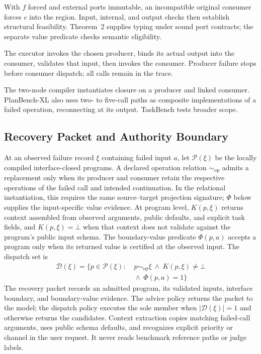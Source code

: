 With $f$ forced and external ports immutable, an incompatible original
consumer forces $c$ into the region. Input, internal, and output checks then
establish structural feasibility. Theorem~2 supplies typing under sound port
contracts; the separate value predicate checks semantic eligibility.

The executor invokes the chosen producer, binds its actual output into the
consumer, validates that input, then invokes the consumer. Producer failure
stops before consumer dispatch; all calls remain in the trace.

The two-node compiler instantiates closure on a producer and linked consumer.
PlanBench-XL also uses two- to five-call paths as composite implementations of
a failed operation, reconnecting at its output. TaskBench tests broader scope.

\subsection{Recovery Packet and Authority Boundary}
At an observed failure record $\xi$ containing failed input $a$, let
$\mathcal{P}(\xi)$ be the locally compiled interface-closed programs. A declared
operation relation $\sim_{\mathrm{op}}$ admits a
replacement only when its producer and consumer retain the respective
operations of the failed call and intended continuation. In the relational
instantiation, this requires the same source--target projection signature;
$\Phi$ below supplies the input-specific value evidence. At program level,
$K(p,\xi)$ returns context assembled from
observed arguments, public defaults, and explicit task fields, and
$K(p,\xi)=\bot$ when that context does not validate against the program's public
input schema. The boundary-value predicate $\Phi(p,a)$ accepts a program only
when its returned value is certified at the observed input. The dispatch set is
\begin{equation}
\begin{aligned}
\mathcal{D}(\xi)=\{p\in\mathcal{P}(\xi):\;&
p\sim_{\mathrm{op}}\xi\ \land\ K(p,\xi)\ne\bot\\
&{}\land\ \Phi(p,a)=1\}
\end{aligned}
\label{eq:dispatch-set}
\end{equation}
The recovery packet records an admitted program, its validated inputs,
interface boundary, and boundary-value evidence. The advice policy returns the packet
to the model; the dispatch policy executes the sole member when
$|\mathcal{D}(\xi)|=1$ and otherwise returns the candidates. Context extraction copies matching failed-call arguments, uses
public schema defaults, and recognizes explicit priority or channel in the
user request. It never reads benchmark reference paths or judge labels.

